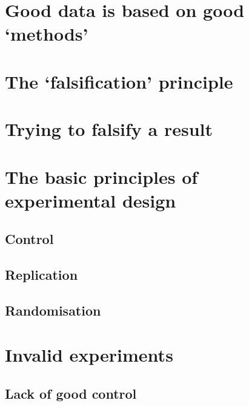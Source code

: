 \documentclass[a4paper,12pt,oneside]{book}
\begin{document}
\hypertarget{good-data-is-based-on-good-methods}{%
\section{Good data is based on good `methods'}\label{good-data-is-based-on-good-methods}}

\hypertarget{the-falsification-principle}{%
\section{The `falsification' principle}\label{the-falsification-principle}}

\hypertarget{trying-to-falsify-a-result}{%
\section{Trying to falsify a result}\label{trying-to-falsify-a-result}}

\hypertarget{the-basic-principles-of-experimental-design}{%
\section{The basic principles of experimental design}\label{the-basic-principles-of-experimental-design}}

\hypertarget{control}{%
\subsection{Control}\label{control}}

\hypertarget{replication}{%
\subsection{Replication}\label{replication}}

\hypertarget{randomisation}{%
\subsection{Randomisation}\label{randomisation}}

\hypertarget{invalid-experiments}{%
\section{Invalid experiments}\label{invalid-experiments}}

\hypertarget{lack-of-good-control}{%
\subsection{Lack of good control}\label{lack-of-good-control}}
\end{document}
